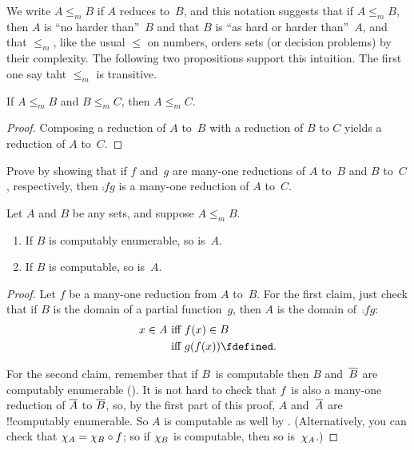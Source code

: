 \documentclass[../../../include/open-logic-section]{subfiles}
\begin{document}

We write $A \leq_m B$ if $A$ reduces to~$B$, and this notation
suggests that if $A \leq_m B$, then $A$ is ``no harder than''~$B$ and
that $B$ is ``as hard or harder than''~$A$, and that $\le_m$, like the
usual $\le$ on numbers, orders sets (or decision problems) by their
complexity. The following two propositions support this intuition. The
first one say taht $\le_m$ is transitive.

\begin{prop}
If $A \leq_m B$ and $B \leq_m C$, then $A \leq_m C$.
\end{prop}

\begin{proof}
Composing a reduction of $A$ to~$B$ with a reduction of $B$ to
$C$ yields a reduction of $A$ to~$C$.
\end{proof}

\begin{prob}
Prove  by showing that if $f$ and~$g$ are
many-one reductions of $A$ to~$B$ and $B$ to~$C$, respectively, then
$\comp{f}{g}$ is a many-one reduction of $A$ to~$C$.
\end{prob}

\begin{prop}
Let $A$ and $B$ be any sets, and suppose $A \leq_m B$.
\begin{enumerate}
\item If $B$ is computably enumerable, so is~$A$.
\item If $B$ is computable, so is~$A$.
\end{enumerate}
\end{prop}

\begin{proof}
Let $f$ be a many-one reduction from $A$ to~$B$. For the first
claim, just check that if $B$ is the domain of a partial function~$g$,
then $A$ is the domain of~$\comp{f}{g}$:
\begin{align*}
x \in A & \text{ iff } f(x) \in B \\
& \text{ iff }  g(f(x)) \fdefined.
\end{align*}

For the second claim, remember that if $B$~is computable then $B$
and~$\Complement{B}$ are computably enumerable
(). It is not hard to check that $f$~is also a
many-one reduction of $\Complement{A}$ to $\Complement{B}$, so, by the
first part of this proof, $A$ and~$\Complement{A}$ are !!{computably
enumerable}. So $A$ is computable as well by .
(Alternatively, you can check that $\Char{A} = \comp{f}{\Char{B}}$; so
if $\Char{B}$ is computable, then so is~$\Char{A}$.)
\end{proof}
\end{document}
